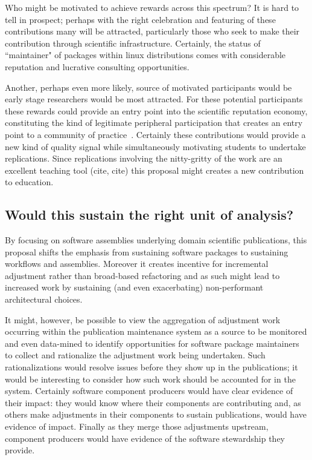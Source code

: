\documentclass{sigchi}
\begin{document}
Who might be motivated to achieve rewards across this spectrum? It is hard to tell in prospect; perhaps with the right celebration and featuring of these contributions many will be attracted, particularly those who seek to make their contribution through scientific infrastructure.  Certainly, the status of ``maintainer" of packages within linux distributions comes with considerable reputation and lucrative consulting opportunities.  

Another, perhaps even more likely, source of motivated participants would be early stage researchers would be most attracted. For these potential participants these rewards could provide an entry point into the scientific reputation economy, constituting the kind of legitimate peripheral participation that creates an entry point to a community of practice~\cite{wenger_communities_1998}. Certainly these contributions would provide a new kind of quality signal while simultaneously motivating students to undertake replications. Since replications involving the nitty-gritty of the work are an excellent teaching tool (cite, cite) this proposal might creates a new contribution to education.

\subsection{Would this sustain the right unit of analysis?}

By focusing on software assemblies underlying domain scientific publications, this proposal shifts the emphasis from sustaining software packages to sustaining workflows and assemblies. Moreover it creates incentive for incremental adjustment rather than broad-based refactoring and as such might lead to increased work by sustaining (and even exacerbating) non-performant architectural choices.

It might, however, be possible to view the aggregation of adjustment work occurring within the publication maintenance system as a source to be monitored and even data-mined to identify opportunities for software package maintainers to collect and rationalize the adjustment work being undertaken. Such rationalizations would resolve issues before they show up in the publications; it would be interesting to consider how such work should be accounted for in the system. Certainly software component producers would have clear evidence of their impact: they would know where their components are contributing and, as others make adjustments in their components to sustain publications, would have evidence of impact. Finally as they merge those adjustments upstream, component producers would have evidence of the software stewardship they provide.
\end{document}
